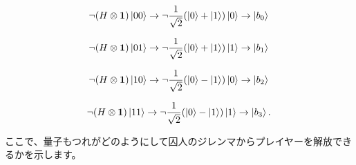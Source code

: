 \begin{equation}
\label{129}
\lnot (H \otimes  \mathbf{1} ) \ket{00}
\to
\lnot \frac{1}{\sqrt{2}}(\ket{0} + \ket{1}) \ket{0}
\to \ket{b_0}
\end{equation}

\begin{equation}
\label{130}
\lnot (H \otimes \mathbf{1} ) \ket{01}
\to
\lnot \frac{1}{\sqrt{2}}(\ket{0} + \ket{1}) \ket{1}
\to \ket{b_1}
\end{equation}

\begin{equation}
\label{131}
\lnot (H \otimes  \mathbf{1} ) \ket{10}
\to
\lnot \frac{1}{\sqrt{2}}(\ket{0} - \ket{1}) \ket{0}
\to \ket{b_2}
\end{equation}

\begin{equation}
\label{132}
\lnot (H \otimes  \mathbf{1} ) \ket{11}
\to
\lnot \frac{1}{\sqrt{2}}(\ket{0} - \ket{1}) \ket{1}
\to \ket{b_3}.
\end{equation}

ここで、量子もつれがどのようにして囚人のジレンマからプレイヤーを解放できるかを示します。
